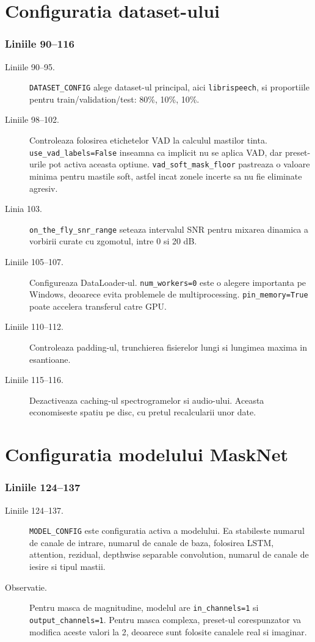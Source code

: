 \documentclass[12pt,a4paper]{report}
\newcommand{\codechunk}[2]{%
\subsection*{Liniile #1--#2}

}
\begin{document}
\chapter{Configuratia dataset-ului}

\codechunk{90}{116}

\begin{description}
    \item[Liniile 90--95.] \texttt{DATASET\_CONFIG} alege dataset-ul principal,
    aici \texttt{librispeech}, si proportiile pentru train/validation/test:
    80\%, 10\%, 10\%.

    \item[Liniile 98--102.] Controleaza folosirea etichetelor VAD la calculul
    mastilor tinta. \texttt{use\_vad\_labels=False} inseamna ca implicit nu se
    aplica VAD, dar preset-urile pot activa aceasta optiune. \texttt{vad\_soft\_mask\_floor}
    pastreaza o valoare minima pentru mastile soft, astfel incat zonele incerte
    sa nu fie eliminate agresiv.

    \item[Linia 103.] \texttt{on\_the\_fly\_snr\_range} seteaza intervalul SNR
    pentru mixarea dinamica a vorbirii curate cu zgomotul, intre 0 si 20 dB.

    \item[Liniile 105--107.] Configureaza DataLoader-ul. \texttt{num\_workers=0}
    este o alegere importanta pe Windows, deoarece evita problemele de multiprocessing.
    \texttt{pin\_memory=True} poate accelera transferul catre GPU.

    \item[Liniile 110--112.] Controleaza padding-ul, trunchierea fisierelor lungi
    si lungimea maxima in esantioane.

    \item[Liniile 115--116.] Dezactiveaza caching-ul spectrogramelor si audio-ului.
    Aceasta economiseste spatiu pe disc, cu pretul recalcularii unor date.
\end{description}

\chapter{Configuratia modelului MaskNet}

\codechunk{124}{137}

\begin{description}
    \item[Liniile 124--137.] \texttt{MODEL\_CONFIG} este configuratia activa a
    modelului. Ea stabileste numarul de canale de intrare, numarul de canale de
    baza, folosirea LSTM, attention, rezidual, depthwise separable convolution,
    numarul de canale de iesire si tipul mastii.

    \item[Observatie.] Pentru masca de magnitudine, modelul are \texttt{in\_channels=1}
    si \texttt{output\_channels=1}. Pentru masca complexa, preset-ul corespunzator
    va modifica aceste valori la 2, deoarece sunt folosite canalele real si imaginar.
\end{description}
\end{document}
